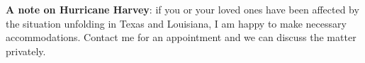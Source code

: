 \documentclass[11pt]{article}
\begin{document}
\textbf{A note on Hurricane Harvey}: if you or your loved ones have been affected by the situation unfolding in Texas and Louisiana, I am happy to make necessary accommodations. Contact me for an appointment and we can discuss the matter privately.




\end{document}
